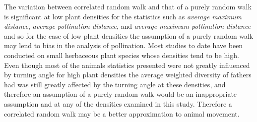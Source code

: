 The variation between correlated random walk and that of a purely random walk is significant at low
plant densities for the statistics such as \emph{average maximum distance}, \emph{average
pollination distance}, and \emph{average maximum pollination distance} and so for the case of low
plant densities the assumption of a purely random walk may lend to bias in the analysis of
pollination. Most studies to date have been conducted on small herbaceous plant species whose
densities tend to be high. Even though most of the animals statistics presented were not greatly
influenced by turning angle for high plant densities the average weighted diversity of fathers had was
still greatly affected by the turning angle at these densities, and therefore an assumption of a
purely random walk would be an inappropriate assumption and at any of the densities examined in this
study. Therefore a correlated random walk may be a better approximation to animal movement.



